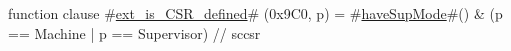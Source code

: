 function clause #\hyperref[sailRISCVzextzyiszyCSRzydefined]{ext\_is\_CSR\_defined}# (0x9C0, p) = #\hyperref[sailRISCVzhaveSupMode]{haveSupMode}#() & (p == Machine | p == Supervisor) // sccsr
